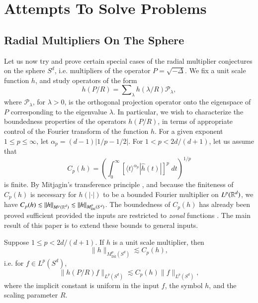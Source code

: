 \part{Attempts To Solve Problems}

\chapter{Radial Multipliers On The Sphere}

Let us now try and prove certain special cases of the radial multiplier conjectures on the sphere $S^d$, i.e. multipliers of the operator $P = \sqrt{-\Delta}$. We fix a unit scale function $h$, and study operators of the form
%
\[ h \left( P / R \right) = \sum\nolimits_\lambda h(\lambda / R) \mathcal{P}_\lambda, \]
%
where $\mathcal{P}_\lambda$, for $\lambda > 0$, is the orthogonal projection operator onto the eigenspace of $P$ corresponding to the eigenvalue $\lambda$. In particular, we wish to characterize the boundedness properties of the operators $h(P/R)$, in terms of appropriate control of the Fourier transform of the function $h$. For a given exponent $1 \leq p \leq \infty$, let $\alpha_p = (d-1)|1/p - 1/2|$. For $1 < p < 2d/(d+1)$, let us assume that
%
\[ C_p(h) = \left( \int_0^\infty \left[ \langle t \rangle^{\alpha_p} |\widehat{h}(t)| \right]^p\; dt \right)^{1/p} \]
%
is finite. By Mitjagin's transference principle \cite{Mitjagin}, and because the finiteness of $C_p(h)$ is necessary for $h(|\cdot|)$ to be a bounded Fourier multiplier on $L^p(\operatorname{\mathbb{R}}^d)$, we have $C_p(h) \lesssim \| h \|_{M^p(\operatorname{\mathbb{R}}^d)} \lesssim \| h \|_{M^p_{\text{Dil}}(S^d)}$. The boundedness of $C_p(h)$ has already been proved sufficient provided the inputs are restricted to \emph{zonal} functions \cite{Alladi}. The main result of this paper is to extend these bounds to general inputs.

\begin{theorem} \label{MainSphereTheorem}
    Suppose $1 \leq p < 2d/(d+1)$. If $h$ is a unit scale multiplier, then
    \[ \| h \|_{M^p_{\text{Dil}}(S^d)} \lesssim C_p(h), \]
    i.e. for $f \in L^p(S^d)$,
    \[ \| h(P/R) f \|_{L^p(S^d)} \lesssim C_p(h) \| f \|_{L^p(S^d)}, \]
    where the implicit constant is uniform in the input $f$, the symbol $h$, and the scaling parameter $R$.
\end{theorem}

